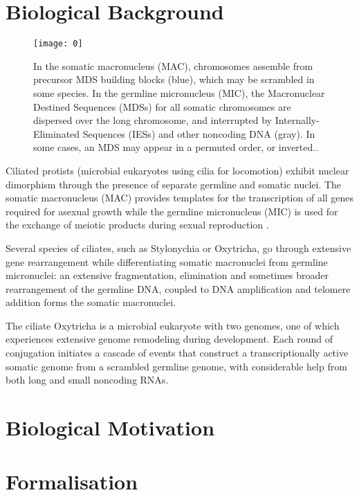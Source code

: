\section{Biological Background}

\begin{figure}[h]
  \centering
	\texttt{[image: 0]}
  \caption{In the somatic macronucleus (MAC), chromosomes assemble from precursor MDS building blocks (blue), which may be scrambled in some species. In the germline micronucleus (MIC), the Macronuclear Destined Sequences (MDSs) for all somatic chromosomes are dispersed over the long chromosome, and interrupted by Internally-Eliminated Sequences (IESs) and other noncoding DNA (gray). In some cases, an MDS may appear in a permuted order, or inverted.\cite{mdsiesdb}.
}
\end{figure}

Ciliated protists (microbial eukaryotes using cilia for locomotion) exhibit nuclear dimorphism through the presence of separate germline and somatic nuclei. The somatic macronucleus (MAC) provides templates for the transcription of all genes required for asexual growth while the germline micronucleus (MIC) is used for the exchange of meiotic products during sexual reproduction \cite{mdsiesdb}.

Several species of ciliates, such as Stylonychia or Oxytricha, go through extensive gene rearrangement while differentiating somatic macronuclei from germline micronuclei: an extensive fragmentation, elimination and sometimes broader rearrangement of the germline DNA, coupled to DNA amplification and telomere addition \cite{ciliatedDNA} forms the somatic macronuclei.



The ciliate Oxytricha is a microbial eukaryote with two genomes, one of which experiences
extensive genome remodeling during development. Each round of conjugation initiates a cascade
of events that construct a transcriptionally active somatic genome from a scrambled germline
genome, with considerable help from both long and small noncoding RNAs.
\section{Biological Motivation}
\cite{ANGELESKA20093020}

\section{Formalisation}

